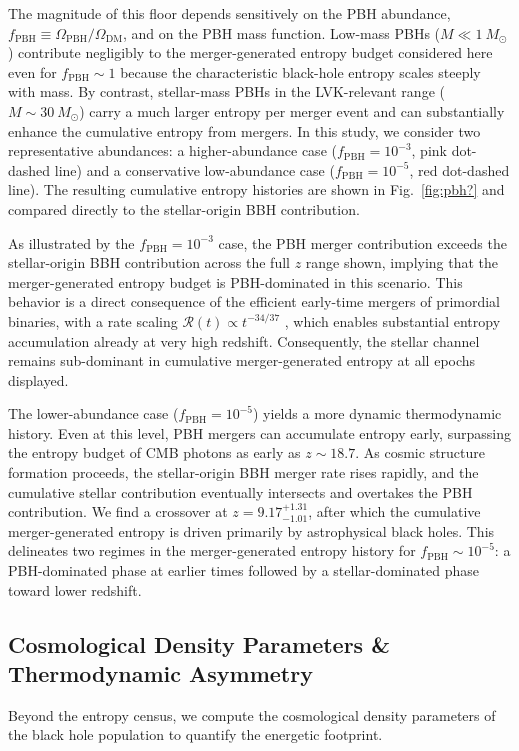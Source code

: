 \documentclass[twocolumn]{aastex631}
\begin{document}
The magnitude of this floor depends sensitively on the PBH abundance, $f_\mathrm{PBH} \equiv \Omega_\mathrm{PBH}/\Omega_\mathrm{DM}$, and on the PBH mass function. Low-mass PBHs ($M \ll 1~M_\odot$) contribute negligibly to the merger-generated entropy budget considered here even for $f_\mathrm{PBH} \sim 1$ because the characteristic black-hole entropy scales steeply with mass. By contrast, stellar-mass PBHs in the LVK-relevant range ($M \sim 30~M_\odot$) carry a much larger entropy per merger event and can substantially enhance the cumulative entropy from mergers. In this study, we consider two representative abundances: a higher-abundance case ($f_\mathrm{PBH} = 10^{-3}$, pink dot-dashed line) and a conservative low-abundance case ($f_\mathrm{PBH} = 10^{-5}$, red dot-dashed line). The resulting cumulative entropy histories are shown in Fig.~\ref{fig:pbh?} and compared directly to the stellar-origin BBH contribution.

As illustrated by the $f_\mathrm{PBH} = 10^{-3}$ case, the PBH merger contribution exceeds the stellar-origin BBH contribution across the full $z$ range shown, implying that the merger-generated entropy budget is PBH-dominated in this scenario. This behavior is a direct consequence of the efficient early-time mergers of primordial binaries, with a rate scaling $\mathcal{R}(t) \propto t^{-34/37}$ \citep{Sasaki_2016}, which enables substantial entropy accumulation already at very high redshift. Consequently, the stellar channel remains sub-dominant in cumulative merger-generated entropy at all epochs displayed.

The lower-abundance case ($f_\mathrm{PBH} = 10^{-5}$) yields a more dynamic thermodynamic history. Even at this level, PBH mergers can accumulate entropy early, surpassing the entropy budget of CMB photons as early as $z \sim 18.7$. As cosmic structure formation proceeds, the stellar-origin BBH merger rate rises rapidly, and the cumulative stellar contribution eventually intersects and overtakes the PBH contribution. We find a crossover at $z=9.17^{+1.31}_{-1.01}$, after which the cumulative merger-generated entropy is driven primarily by astrophysical black holes. This delineates two regimes in the merger-generated entropy history for $f_\mathrm{PBH} \sim 10^{-5}$: a PBH-dominated phase at earlier times followed by a stellar-dominated phase toward lower redshift.

\subsection{Cosmological Density Parameters \& Thermodynamic Asymmetry}
Beyond the entropy census, we compute the cosmological density parameters of the black hole population to quantify the energetic footprint.
\end{document}
